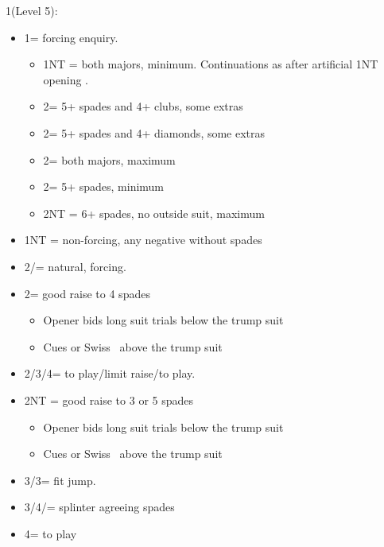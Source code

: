 \documentclass[a4paper,14pt]{extarticle}
\begin{document}
\begin{itemize}
{\it 
\item 1\hearts (Level 5):
	\begin{itemize}
   \item 1\spades = forcing enquiry.
		\begin{itemize}
      \item 1NT = both majors, minimum. Continuations as after artificial 1NT opening .
      \item 2\clubs = 5+ spades and 4+ clubs, some extras
      \item 2\diamonds = 5+ spades and 4+ diamonds, some extras
      \item 2\hearts = both majors, maximum
		\item 2\spades = 5+ spades, minimum
		\item 2NT = 6+ spades, no outside suit, maximum
		\end{itemize}
   \item 1NT = non-forcing, any negative without spades
   \item 2\clubs/\diamonds = natural, forcing.
   \item 2\hearts = good raise to 4 spades
		\begin{itemize}
		\item Opener bids long suit trials below the trump suit
		\item Cues or Swiss~ above the trump suit
		\end{itemize}
   \item 2\spades/3\spades/4\spades = to play/limit raise/to play.
\label{note:1}
   \item 2NT = good raise to 3 or 5 spades
		\begin{itemize}
		\item Opener bids long suit trials below the trump suit
		\item Cues or Swiss~ above the trump suit
		\end{itemize}
\label{note:2}
   \item 3\clubs/3\diamonds = fit jump.
\label{note:6}
   \item 3\hearts/4\clubs/\diamonds = splinter agreeing spades
	\item 4\hearts = to play
	\end{itemize}
}


\end{itemize}
\end{document}
